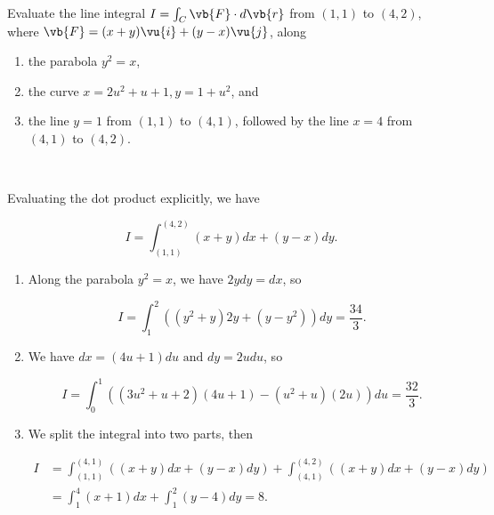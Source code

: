 \documentclass[english,a4paper,12pt]{report}
\begin{document}
{Evaluate the line integral \(I = \int_{C}^{} \vb{F} \cdot d\vb{r}  \) from \((1,1)\) to \((4,2)\), where \(\vb{F}  = (x+y)\vu{i} + (y-x)\vu{j} \), along 
\begin{enumerate}[itemsep=10pt]
	\item the parabola \(y^2 = x\),
	\item the curve \(x = 2u^2+u+1, y= 1+u^2\), and
	\item the line \(y=1\) from \((1,1)\) to \((4,1)\), followed by the line \(x = 4\) from \((4,1)\) to \((4,2)\).      
\end{enumerate}~
}
{Evaluating the dot product explicitly, we have 

\begin{equation}
	 I = \int_{(1,1)}^{(4,2)} (x+y)dx + (y-x)dy.
\end{equation}

\begin{enumerate}
	\item Along the parabola \(y^2 = x\), we have \(2ydy = dx\), so 
	
	\begin{equation}
		I = \int_{1}^{2} ((y^2+y)2y + (y - y^2))dy = \frac{34}{3}.    
	\end{equation}
	
	\item We have \(dx = (4u+1)du \text { and } dy = 2udu\), so
	
	\begin{equation}
		I = \int_{0}^{1} ((3u^2+u+2)(4u+1)-(u^2+u)(2u))du = \frac{32}{3}.  
	\end{equation}
	
	\item We split the integral into two parts, then 
	
	\begin{equation}
	\begin{aligned} 
		I &= \int_{(1,1)}^{(4,1)} ((x+y)dx + (y-x)dy) + \int_{(4,1)}^{(4,2)} ((x+y)dx + (y-x)dy) \\ &= \int_{1}^{4} (x+1)dx + \int_{1}^{2} (y-4)dy = 8.      
	\end{aligned} 
    \end{equation}
\end{enumerate}~
} 
\end{document}
